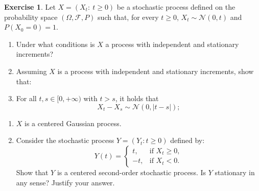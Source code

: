 \documentclass[
  11pt,
  a4paper,
]{book}
\theoremstyle{definition}
\theoremstyle{definition}
\theoremstyle{definition}
\newtheorem{exercise}{Exercise}[chapter]
\theoremstyle{definition}
\theoremstyle{remark}
\begin{document}
\begin{exercise}

Let \(X = (X_t: ~ t \geq 0)\) be a stochastic process defined on the probability space \((\Omega, \mathcal{F}, P)\) such that, for every \(t \geq 0\), \(X_t \sim \mathcal{N}(0, t)\) and \(P(X_0 = 0) = 1\).

\begin{enumerate}
\def\labelenumi{(\alph{enumi})}
\item
  Under what conditions is \(X\) a process with independent and stationary increments?
\item
  Assuming \(X\) is a process with independent and stationary increments, show that:
\item
  For all \(t, s \in [0,+\infty)\) with \(t > s\), it holds that
  \[X_t - X_s \sim \mathcal{N}(0, |t - s|);\]
\end{enumerate}

\begin{enumerate}
\def\labelenumi{(\roman{enumi})}
\setcounter{enumi}{1}
\item
  \(X\) is a centered Gaussian process.
\item
  Consider the stochastic process \(Y = (Y_t: t \geq 0)\) defined by:
  \[
  Y(t) = 
  \begin{cases}
  t, & \text{if } X_t \geq 0, \\
  -t, & \text{if } X_t < 0.
  \end{cases}
  \]
  Show that \(Y\) is a centered second-order stochastic process. Is \(Y\) stationary in any sense? Justify your answer.
\end{enumerate}

\end{exercise}

\(\,\)
\end{document}
